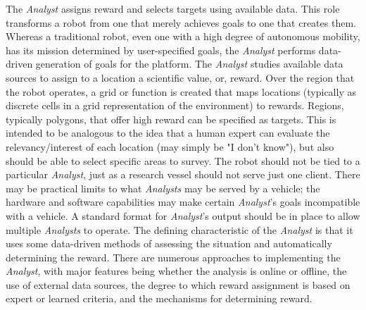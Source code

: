 \documentclass{tamuccthesis}
\begin{document}
The \textit{Analyst} assigns reward and selects targets using available data. This role transforms a robot from one that merely achieves goals to one that creates them. Whereas a traditional robot, even one with a high degree of autonomous mobility, has its mission determined by user-specified goals, the \textit{Analyst} performs data-driven generation of goals for the platform. The \textit{Analyst} studies available data sources to assign to a location a scientific value, or, reward. Over the region that the robot operates, a grid or function is created that maps locations (typically as discrete cells in a grid representation of the environment) to rewards. Regions, typically polygons, that offer high reward can be specified as targets. This is intended to be analogous to the idea that a human expert can evaluate the relevancy/interest of each location (may simply be "I don't know"), but also should be able to select specific areas to survey. The robot should not be tied to a particular \textit{Analyst}, just as a research vessel should not serve just one client. There may be practical limits to what \textit{Analysts} may be served by a vehicle; the hardware and software capabilities may make certain \textit{Analyst}'s goals incompatible with a vehicle. A standard format for \textit{Analyst}'s output should be in place to allow multiple \textit{Analysts} to operate. The defining characteristic of the \textit{Analyst} is that it uses some data-driven methods of assessing the situation and automatically determining the reward. There are numerous approaches to implementing the \textit{Analyst}, with major features being whether the analysis is online or offline, the use of external data sources, the degree to which reward assignment is based on expert or learned criteria, and the mechanisms for determining reward. 
\end{document}
